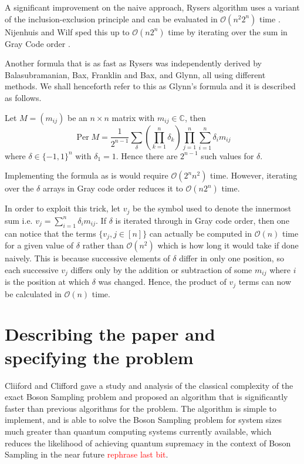 \documentclass[11pt]{article}
\theoremstyle{theorem}
\theoremstyle{theorem}
\theoremstyle{remark}
\theoremstyle{note}
\theoremstyle{plain}
\theoremstyle{definition}
\DeclareMathOperator*{\Per}{\mathrm{Per}}
\begin{document}
A significant improvement on the naive approach, Rysers algorithm uses a variant of the inclusion-exclusion principle and can be evaluated in $\mathcal{O}(n^2 2^n)$ time  \cite{ryser_1963}. Nijenhuis and Wilf sped this up to $\mathcal{O}(n2^n)$ time by iterating over the sum in Gray Code order \cite{Nijenhuis1978}.

Another formula that is as fast as Rysers was independently derived by Balasubramanian\cite{balasubramanian1980}, Bax\cite{bax1998}, Franklin and Bax\cite{bax1996}, and Glynn\cite{glynn2010}, all using different methods. We shall henceforth refer to this as Glynn's formula and it is described as follows.

Let $M = (m_{ij})$ be an $n \times n$ matrix with $m_{ij} \in \mathbb{C}$, then
\begin{equation}
\Per M = \frac{1}{2^{n-1}} \sum_\delta \left( \prod_{k=1}^n \delta_k \right) \prod_{j=1}^n\sum_{i=1}^n \delta_i m_{ij}
\end{equation}
where $\delta \in \{-1, 1\}^n$ with $\delta_1 = 1$. Hence there are $2^{n-1}$ such values for $\delta$.

Implementing the formula as is would require $\mathcal{O}(2^n n^2)$ time. However, iterating over the $\delta$ arrays in Gray code order reduces it to $\mathcal{O}(n 2^n)$ time.

In order to exploit this trick, let $v_j$ be the symbol used to denote the innermost sum i.e. $v_j = \sum_{i=1}^n \delta_i m_{ij}$. If $\delta$ is iterated through in Gray code order, then one can notice that the terms $\{ v_j, j \in [n]\}$ can actually be computed in $\mathcal{O}(n)$ time for a given value of $\delta$ rather than $\mathcal{O}(n^2)$ which is how long it would take if done naively. This is because successive elements of $\delta$ differ in only one position, so each successive $v_j$ differs only by the addition or subtraction of some $m_{ij}$ where $i$ is the position at which $\delta$ was changed. Hence, the product of $v_j$ terms can now be calculated in $\mathcal{O}(n)$ time.
\section{Describing the paper and specifying the problem} %
Cliiford and Clifford \cite{clifford17} gave a study and analysis of the classical complexity of the exact Boson Sampling problem and proposed an algorithm that is significantly faster than previous algorithms for the problem. The algorithm is simple to implement, and is able to solve the Boson Sampling problem for system sizes much greater than quantum computing systems currently available, which reduces the likelihood of achieving quantum supremacy in the context of Boson Sampling in the near future \textcolor{red}{rephrase last bit}.
\end{document}
